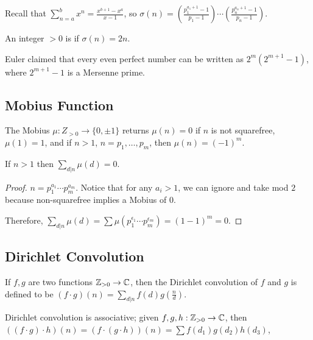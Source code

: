 \documentclass{article}
\begin{document}
Recall that $\sum_{n = a}^b x^n = \frac{x^{b + 1} - x^a}{x - 1}$, so $\sigma(n) = \left(\frac{p_1^{a_1 + 1} - 1}{p_1 - 1}\right) \cdots \left(\frac{p_n^{a_n + 1} - 1}{p_n - 1}\right)$.

\begin{definition}
    An integer $> 0$ is  if $\sigma(n) = 2n$.
\end{definition}

Euler claimed that every even perfect number can be written as $2^m(2^{m + 1} - 1)$, where $2^{m + 1} - 1$ is a Mersenne prime.

\subsection{Mobius Function}

\begin{definition}
    The Mobius $\mu : Z_{> 0} \to \{0, \pm 1\}$ returns $\mu(n) = 0$ if $n$ is not squarefree, $\mu(1) = 1$, and if $n > 1$, $n = p_1, \ldots, p_m$, then $\mu(n) = (-1)^m$.
\end{definition}

\begin{proposition}
    If $n > 1$ then $\sum_{d | n} \mu(d) = 0$.
\end{proposition}

\begin{proof}
    $n = p_1^{a_1} \cdots p_m^{a_m}$. Notice that for any $a_i > 1$, we can ignore and take mod $2$ because non-squarefree implies a Mobius of $0$.
    
    Therefore, $\sum_{d|n} \mu(d) = \sum \mu(p_1^{\epsilon_1} \cdots p_m^{\epsilon_m}) = (1 - 1)^m = 0$.
\end{proof}

\subsection{Dirichlet Convolution}

\begin{definition}
    If $f, g$ are two functions $\mathbb Z_{> 0} \to \mathbb C$, then the Dirichlet convolution of $f$ and $g$ is defined to be $(f \cdot g)(n) = \sum_{d | n} f(d)g(\frac{n}{d})$.
\end{definition}

\begin{remark}
    Dirichlet convolution is associative; given $f, g, h : \mathbb Z_{> 0} \to \mathbb C$, then $((f \cdot g) \cdot h)(n) = (f \cdot (g \cdot h))(n) = \sum f(d_1) g(d_2) h(d_3)$,
\end{remark}
\end{document}
